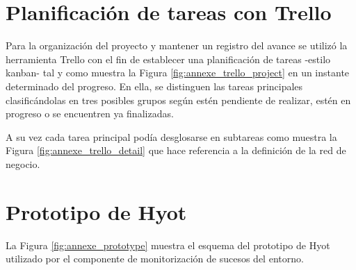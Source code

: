 \documentclass[12pt,a4paper, twoside]{report}
\makeatletter
\newcommand{\blankpage}{
				\newpage
				\thispagestyle{empty}
				\mbox{}
				\newpage
				}
\let\plainappendixpage\appendixpage
\renewcommand{\appendixpage}{%
  \begingroup
  \let\ps@plain\ps@empty
  \plainappendixpage
  \endgroup}
\makeatother
\begin{document}
	
			
	\thispagestyle{empty}
			
	\renewcommand{\appendixname}{Anexo}
	\renewcommand{\appendixtocname}{Anexos}
	\renewcommand{\appendixpagename}{ANEXOS} 
	\appendix 
	\addappheadtotoc 
	\appendixpage 
	
	\blankpage

	\chapter{Planificación de tareas con Trello}\label{trello}
	
	Para la organización del proyecto y mantener un registro del avance se utilizó la herramienta Trello con el fin de establecer una planificación de tareas -estilo \gls{kanban}- tal y como muestra la Figura \ref{fig:annexe_trello_project} en un instante determinado del progreso. En ella, se distinguen las tareas principales clasificándolas en tres posibles grupos según estén pendiente de realizar, estén en progreso o se encuentren ya finalizadas. 
	
		
	A su vez cada tarea principal podía desglosarse en subtareas como muestra la Figura \ref{fig:annexe_trello_detail} que hace referencia a la definición de la red de negocio.

			
	\chapter{Prototipo de Hyot}\label{prototype}
	
	La Figura \ref{fig:annexe_prototype} muestra el esquema del \gls{prototipo} de Hyot utilizado por el componente de monitorización de sucesos del entorno.
	
\end{document}
